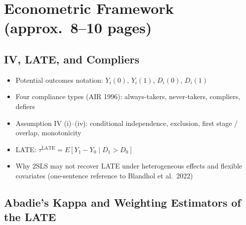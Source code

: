 \documentclass[12pt, a4paper]{article}
\begin{document}
\section{Econometric Framework \textnormal{\small(approx.\ 8--10 pages)}}

\subsection{IV, LATE, and Compliers}

\begin{itemize}
  \item Potential outcomes notation: $Y_i(0)$, $Y_i(1)$, $D_i(0)$, $D_i(1)$
  \item Four compliance types (AIR 1996): always-takers, never-takers, compliers, defiers
  \item Assumption IV (i)--(iv): conditional independence, exclusion, first stage / overlap, monotonicity
  \item LATE: $\tau^{\text{LATE}} = E[Y_1 - Y_0 \mid D_1 > D_0]$
  \item Why 2SLS may not recover LATE under heterogeneous effects and flexible covariates (one-sentence reference to Blandhol et al.\ 2022)
\end{itemize}

\subsection{Abadie's Kappa and Weighting Estimators of the LATE}
\end{document}
